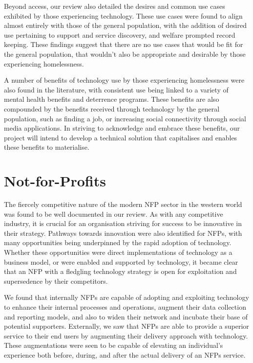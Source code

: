 Beyond access, our review also detailed the desires and common use cases exhibited by those experiencing technology. These use cases were found to align almost entirely with those of the general population, with the addition of desired use pertaining to support and service discovery, and welfare prompted record keeping. These findings suggest that there are no use cases that would be fit for the general population, that wouldn't also be appropriate and desirable by those experiencing homelessness.

A number of benefits of technology use by those experiencing homelessness were also found in the literature, with consistent use being linked to a variety of mental health benefits and deterrence programs. These benefits are also compounded by the benefits received through technology by the general population, such as finding a job, or increasing social connectivity through social media applications. In striving to acknowledge and embrace these benefits, our project will intend to develop a technical solution that capitalises and enables these benefits to materialise.

\section{Not-for-Profits}

The fiercely competitive nature of the modern NFP sector in the western world was found to be well documented in our review. As with any competitive industry, it is crucial for an organisation striving for success to be innovative in their strategy. Pathways towards innovation were also identified for NFPs, with many opportunities being underpinned by the rapid adoption of technology. Whether these opportunities were direct implementations of technology as a business model, or were enabled and supported by technology, it became clear that an NFP with a fledgling technology strategy is open for exploitation and supersedence by their competitors.

We found that internally NFPs are capable of adopting and exploiting technology to enhance their internal processes and operations, augment their data collection and reporting models, and also to widen their network and incubate their base of potential supporters. Externally, we saw that NFPs are able to provide a superior service to their end users by augmenting their delivery approach with technology. These augmentations were seen to be capable of elevating an individual's experience both before, during, and after the actual delivery of an NFPs service.

